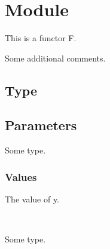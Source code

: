 \section{Module }\label{container-page-test+u+package+++ml-module-Nested-module-F}%
This is a functor F.

Some additional comments.

\subsection{Type\label{type}}%
\subsection{Parameters\label{parameters}}%
\label{container-page-test+u+package+++ml-module-Nested-module-F-argument-1-Arg1}\begin{ocamlindent}\label{container-page-test+u+package+++ml-module-Nested-module-F-argument-1-Arg1-type-t}\begin{ocamlindent}Some type.\end{ocamlindent}%
\medbreak
\subsubsection{Values\label{values}}%
\label{container-page-test+u+package+++ml-module-Nested-module-F-argument-1-Arg1-val-y}\begin{ocamlindent}The value of y.\end{ocamlindent}%
\medbreak
\end{ocamlindent}%
\\
\label{container-page-test+u+package+++ml-module-Nested-module-F-argument-2-Arg2}\begin{ocamlindent}\label{container-page-test+u+package+++ml-module-Nested-module-F-argument-2-Arg2-type-t}\begin{ocamlindent}Some type.\end{ocamlindent}%
\medbreak
\end{ocamlindent}%
\\
